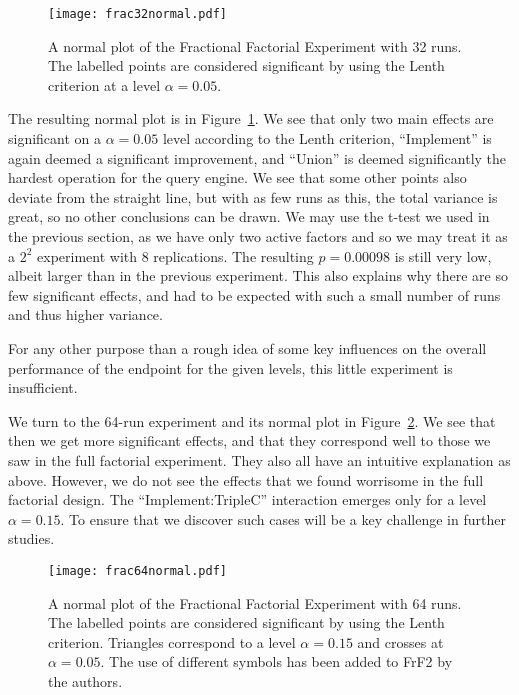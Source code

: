\documentclass{llncs}
\begin{document}
\begin{figure}[ht!]
  \centerline{%
    \texttt{[image: frac32normal.pdf]}}
  \caption{A normal plot of the Fractional Factorial Experiment with
    32 runs. The labelled points are considered significant by using
    the Lenth criterion at a level
    $\alpha=0.05$.}
  \label{fig:frac32normal}
\end{figure}


The resulting normal plot is in Figure~\ref{fig:frac32normal}. We see
that only two main effects are significant on a $\alpha = 0.05$ level
according to the Lenth criterion, ``Implement'' is again deemed a
significant improvement, and ``Union'' is deemed significantly the
hardest operation for the query engine. We see that some other points
also deviate from the straight line, but with as few runs as this, the
total variance is great, so no other conclusions can be drawn. We may
use the t-test we used in the previous section, as we have only two
active factors and so we may treat it as a $2^2$ experiment with 8
replications. The resulting $p = 0.00098$ is still very low, albeit
larger than in the previous experiment. This also explains why there
are so few significant effects, and had to be expected with such a
small number of runs and thus higher variance.


For any other purpose than a rough idea of some key influences on the
overall performance of the endpoint for the given levels, this little
experiment is insufficient.

We turn to the 64-run experiment and its normal plot in
Figure~\ref{fig:frac64normal}. We see that then we get more significant
effects, and that they correspond well to those we saw in the full
factorial experiment. They also all have an intuitive explanation as
above. However, we do not see the effects that we found worrisome in
the full factorial design. The ``Implement:TripleC'' interaction
emerges only for a level $\alpha=0.15$. To ensure that we discover
such cases will be a key challenge in further studies.

\begin{figure}[ht!]
  \centerline{%
    \texttt{[image: frac64normal.pdf]}}
  \caption{A normal plot of the Fractional Factorial Experiment with
    64 runs. The labelled points are considered significant by using
    the Lenth criterion. Triangles correspond to a level $\alpha=0.15$
    and crosses at $\alpha=0.05$. The use of different symbols has
    been added to FrF2 by the authors.}\label{fig:frac64normal}
\end{figure}
\end{document}
